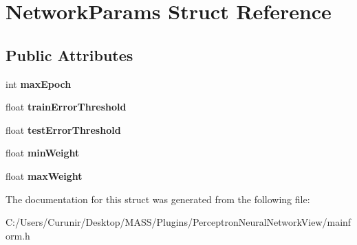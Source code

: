 \hypertarget{struct_network_params}{}\section{Network\+Params Struct Reference}
\label{struct_network_params}
\subsection*{Public Attributes}
\begin{DoxyCompactItemize}
\item 
\mbox{\label{struct_network_params_a6a4d36a5e9c3f72e79ad94c9c919d4fc}} 
int {\bfseries max\+Epoch}
\item 
\mbox{\label{struct_network_params_a592d5c7199126660efcd5c08b1d47c07}} 
float {\bfseries train\+Error\+Threshold}
\item 
\mbox{\label{struct_network_params_ac8724964355a382767bfcf97e6cade9c}} 
float {\bfseries test\+Error\+Threshold}
\item 
\mbox{\label{struct_network_params_a42f00ee3de2b89324804ad4f57fdc9f4}} 
float {\bfseries min\+Weight}
\item 
\mbox{\label{struct_network_params_a57964e4d96787f96a11c9c4f7d988995}} 
float {\bfseries max\+Weight}
\end{DoxyCompactItemize}


The documentation for this struct was generated from the following file\+:\begin{DoxyCompactItemize}
\item 
C\+:/\+Users/\+Curunir/\+Desktop/\+M\+A\+S\+S/\+Plugins/\+Perceptron\+Neural\+Network\+View/mainform.\+h\end{DoxyCompactItemize}

